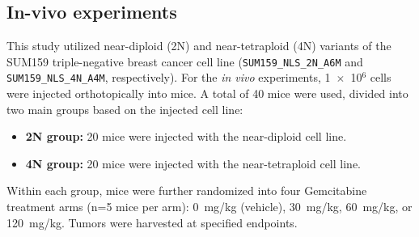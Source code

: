\documentclass[11pt,notitlepage]{article}
\begin{document}





\clearpage




\subsection{In-vivo experiments} \label{invivo}

This study utilized near-diploid (2N) and near-tetraploid (4N) variants of the SUM159 triple-negative breast cancer cell line (\texttt{SUM159\_NLS\_2N\_A6M} and \texttt{SUM159\_NLS\_4N\_A4M}, respectively). For the \textit{in vivo} experiments, 1~$\times$~10$^6$ cells were injected orthotopically into mice. A total of 40 mice were used, divided into two main groups based on the injected cell line:
\begin{itemize}
    \item \textbf{2N group:} 20 mice were injected with the near-diploid cell line.
    \item \textbf{4N group:} 20 mice were injected with the near-tetraploid cell line.
\end{itemize}
Within each group, mice were further randomized into four Gemcitabine treatment arms (n=5 mice per arm): 0~mg/kg (vehicle), 30~mg/kg, 60~mg/kg, or 120~mg/kg. Tumors were harvested at specified endpoints.
\end{document}
